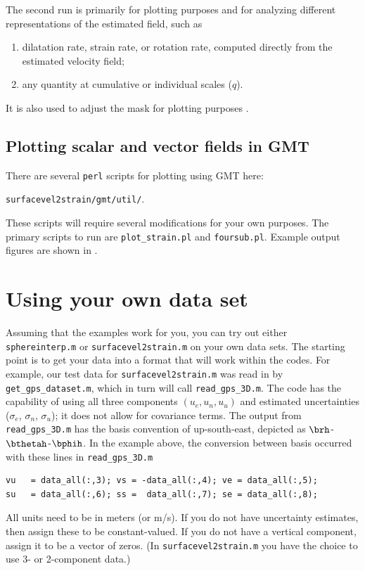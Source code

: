 \documentclass[11pt,titlepage,fleqn]{article}
\begin{document}
The second run is primarily for plotting purposes and for analyzing different representations of the estimated field, such as 
%
\begin{enumerate}
\item dilatation rate, strain rate, or rotation rate, computed directly from the estimated velocity field;
\item any quantity at cumulative or individual scales ($q$).
\end{enumerate}
%
It is also used to adjust the mask for plotting purposes \citep{Tape2009gps}.


\subsection*{Plotting scalar and vector fields in GMT}

There are several \verb+perl+ scripts for plotting using GMT \citep{GMT} here:

\verb+surfacevel2strain/gmt/util/+.

\noindent
These scripts will require several modifications for your own purposes.
The primary scripts to run are \verb+plot_strain.pl+ and \verb+foursub.pl+.
Example output figures are shown in .


\section{Using your own data set}
\label{sec:user}

Assuming that the examples work for you, you can try out either \verb+sphereinterp.m+ or \verb+surfacevel2strain.m+ on your own data sets. The starting point is to get your data into a format that will work within the codes. For example, our test data for \verb+surfacevel2strain.m+ was read in by \verb+get_gps_dataset.m+, which in turn will call \verb+read_gps_3D.m+. The code has the capability of using all three components $(u_e,u_n,u_u)$ and estimated uncertainties ($\sigma_e$, $\sigma_n$, $\sigma_u$); it does not allow for covariance terms. The output from \verb+read_gps_3D.m+ has the basis convention of up-south-east, depicted as $\brh$-$\bthetah$-$\bphih$. In the example above, the conversion between basis occurred with these lines in \verb+read_gps_3D.m+
%
\begin{verbatim}
vu   = data_all(:,3); vs = -data_all(:,4); ve = data_all(:,5);
su   = data_all(:,6); ss =  data_all(:,7); se = data_all(:,8);
\end{verbatim}
%
All units need to be in meters (or m/s). If you do not have uncertainty estimates, then assign these to be constant-valued. If you do not have a vertical component, assign it to be a vector of zeros. (In \verb+surfacevel2strain.m+ you have the choice to use 3- or 2-component data.)
\end{document}
